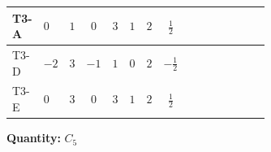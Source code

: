 \documentclass[8pt]{article}
\begin{document}
\begin{landscape}
\begin{longtable}{@{}llcccccc >{\raggedright\arraybackslash}p{0.21\linewidth} >{\raggedright\arraybackslash}p{0.21\linewidth} >{\raggedright\arraybackslash}p{0.21\linewidth}@{}}
\midrule
T3-A & $0$ & $1$ & $0$ & $3$ & $1$ & $2$ & $\frac{1}{2}$ & \scriptsize\adjustbox{max width=\linewidth}{$\begin{gathered} - 3 C_{5} g_{2}^{2}\end{gathered}$} & \scriptsize\adjustbox{max width=\linewidth}{$\begin{gathered} 2 C_{5} \lambda_1\end{gathered}$} & \scriptsize\adjustbox{max width=\linewidth}{$\begin{gathered} - C_{5} Y_e Y_e^\dagger\end{gathered}$} \\
\midrule
T3-D & $-2$ & $3$ & $-1$ & $1$ & $0$ & $2$ & $-\frac{1}{2}$ & \scriptsize\adjustbox{max width=\linewidth}{$\begin{gathered} - 3 C_{5} g_{2}^{2}\end{gathered}$} & \scriptsize\adjustbox{max width=\linewidth}{$\begin{gathered} 2 C_{5} \lambda_1\end{gathered}$} & \scriptsize\adjustbox{max width=\linewidth}{$\begin{gathered} - C_{5} Y_e Y_e^\dagger\end{gathered}$} \\
\midrule
T3-E & $0$ & $3$ & $0$ & $3$ & $1$ & $2$ & $\frac{1}{2}$ & \scriptsize\adjustbox{max width=\linewidth}{$\begin{gathered} - 3 C_{5} g_{2}^{2}\end{gathered}$} & \scriptsize\adjustbox{max width=\linewidth}{$\begin{gathered} 2 C_{5} \lambda_1\end{gathered}$} & \scriptsize\adjustbox{max width=\linewidth}{$\begin{gathered} - C_{5} Y_e Y_e^\dagger\end{gathered}$} \\
\midrule
\bottomrule
\end{longtable}
\clearpage
\noindent\textbf{Quantity: }$C_5$\par\smallskip

\end{landscape}
\end{document}

